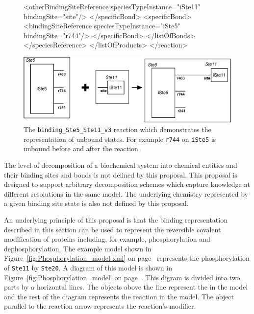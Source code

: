 \documentclass{cekarticle}
\begin{document}
\begin{figure}[h]
\begin{example}
                    <otherBindingSiteReference
                        speciesTypeInstance="iSte11" bindingSite="site"/>
                </specificBond>
                <specificBond>
                    <bindingSiteReference speciesTypeInstance="iSte5" bindingSite="r744"/>
                </specificBond>
            </listOfBonds>
        </speciesReference>
    </listOfProducts>
</reaction>
\end{example}
  \vspace*{8pt}
  \centering
  \includegraphics[scale = 0.7]{binding_Ste5_Ste11_v3.eps}
  \caption{The \texttt{binding\_Ste5\_Ste11\_v3} reaction which demonstrates the
  representation of unbound states. For example  \texttt{r744} on
   \texttt{iSte5} is unbound before and after the reaction}
  \label{fig:binding_Ste5_Ste11_v3}
\end{figure}

The level of decomposition of a biochemical system into chemical entities and their binding sites and
bonds is not defined by this proposal.  This proposal is designed to support arbitrary decomposition
schemes which capture knowledge at different resolutions in the same model. The
underlying chemistry represented by a given binding site state is also not defined by this proposal.

An underlying principle of this proposal is that the binding
representation described in this section can be used to represent
the reversible covalent modification of proteins including, for
example, phosphorylation and dephosphorylation.  The example model
shown in Figure~\ref{fig:Phosphorylation_model-xml} on
page~\pageref{fig:Phosphorylation_model-xml} represents the
phosphorylation of \texttt{Ste11} by \texttt{Ste20}.  A diagram of
this model is shown in Figure~\ref{fig:Phosphorylation_model} on
page~\pageref{fig:Phosphorylation_model}.  This digram is divided
into two parts by a horizontal lines.  The objects above the line
represent the  in the model and the rest of
the diagram represents the reaction in the model.  The object
parallel to the reaction arrow represents the reaction's modifier.
\end{document}
